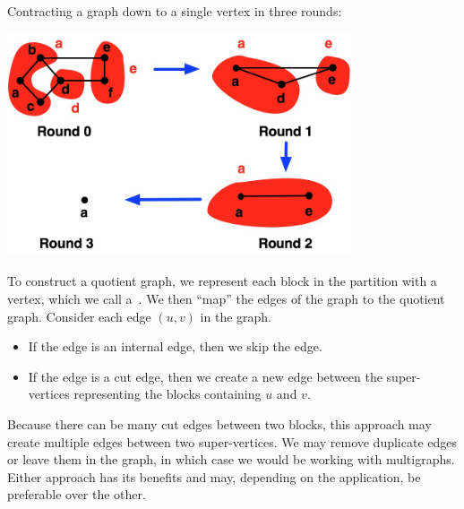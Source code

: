 \begin{flex}
\begin{example}
Contracting a graph down to a single vertex in three rounds:
\begin{center}
\includegraphics[width=4in]{./graph-contraction/media-introduction/graph-contraction-example-1.jpg}
\end{center}
\end{example}
\end{flex}





\begin{gram}
\label{graphcon::intro::graphcon::contruct-quotient}
To construct a quotient graph, we represent each block in the
partition with a vertex,
%
which we call a~.
%
We then ``map'' the edges of the graph to the quotient graph.
% 
Consider each edge $(u,v)$ in the graph.
%
\begin{itemize}
\item If the edge is an internal edge, then we skip the edge.

\item If the edge is a cut edge, then  we create a new edge between the
  super-vertices representing the blocks containing $u$ and $v$.
%
\end{itemize}

Because there can be many cut edges between two blocks, this approach may create
multiple edges between two super-vertices. 
%
We may remove duplicate edges or leave them in the graph, in which case we would be working with multigraphs. 
%
Either approach has its benefits and may, depending on the application, be preferable over the other.
\end{gram}

